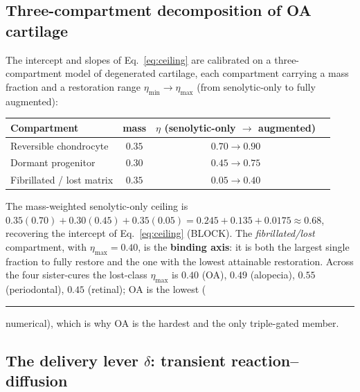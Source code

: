 \documentclass[11pt,a4paper]{article}
\newcommand{\tierdisc}[1]{\textcolor{#1}{\rule[0.05ex]{1.0ex}{1.0ex}}}
\newcommand{\tierGreen}{\tierdisc{green!60!black}} %
\begin{document}
\subsection{Three-compartment decomposition of OA cartilage}
\label{sec:decomp}

The intercept and slopes of Eq.~\eqref{eq:ceiling} are calibrated on a
three-compartment model of degenerated cartilage, each compartment carrying a
mass fraction and a restoration range $\eta_{\min}\!\to\!\eta_{\max}$ (from
senolytic-only to fully augmented):
\begin{center}
\begin{tabular}{lccc}
\toprule
Compartment & mass & $\eta$ (senolytic-only $\to$ augmented) \\
\midrule
Reversible chondrocyte & $0.35$ & $0.70 \to 0.90$ \\
Dormant progenitor & $0.30$ & $0.45 \to 0.75$ \\
Fibrillated / lost matrix & $0.35$ & $0.05 \to 0.40$ \\
\bottomrule
\end{tabular}
\end{center}
The mass-weighted senolytic-only ceiling is
$0.35(0.70)+0.30(0.45)+0.35(0.05)=0.245+0.135+0.0175 \approx 0.68$, recovering
the intercept of Eq.~\eqref{eq:ceiling} (BLOCK). The
\emph{fibrillated/lost} compartment, with $\eta_{\max}=0.40$, is the
\textbf{binding axis}: it is both the largest single fraction to fully restore and
the one with the lowest attainable restoration. Across the four sister-cures the
lost-class $\eta_{\max}$ is $0.40$ (OA), $0.49$ (alopecia), $0.55$ (periodontal),
$0.45$ (retinal); OA is the lowest (\tierGreen{} numerical), which is why OA is the
hardest and the only triple-gated member.

\subsection{The delivery lever $\delta$: transient reaction--diffusion}
\label{sec:delivery}
\end{document}
